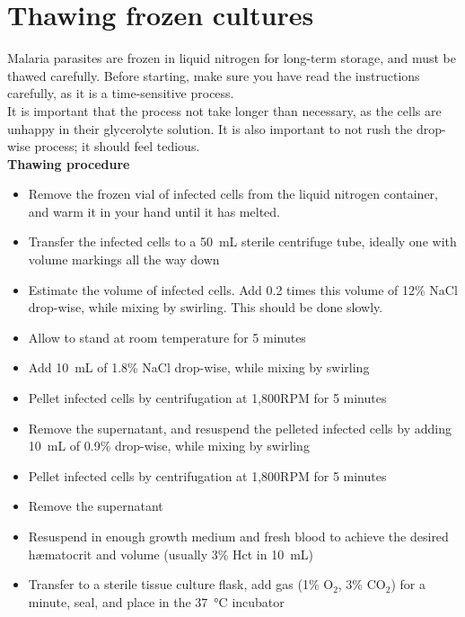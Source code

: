 \documentclass{article}
\begin{document}
\section{Thawing frozen cultures}

Malaria parasites are frozen in liquid nitrogen for long-term storage, and must be thawed carefully. Before starting, make sure you have read the instructions carefully, as it is a time-sensitive process.\\

It is important that the process not take longer than necessary, as the cells are unhappy in their glycerolyte solution. It is also important to not rush the drop-wise process; it should feel tedious.\\

\textbf{Thawing procedure}\\

\begin{itemize}
	\item Remove the frozen vial of infected cells from the liquid nitrogen container, and warm it in your hand until it has melted.
	\item Transfer the infected cells to a \SI{50}{mL} sterile centrifuge tube, ideally one with volume markings all the way down
	\item Estimate the volume of infected cells. Add 0.2 times this volume of 12\% NaCl drop-wise, while mixing by swirling. This should be done slowly.
	\item Allow to stand at room temperature for 5 minutes
	\item Add \SI{10}{mL} of 1.8\% NaCl drop-wise, while mixing by swirling
	\item Pellet infected cells by centrifugation at 1,800RPM for 5 minutes
	\item Remove the supernatant, and resuspend the pelleted infected cells by adding \SI{10}{mL} of 0.9\% drop-wise, while mixing by swirling
	\item Pellet infected cells by centrifugation at 1,800RPM for 5 minutes
	\item Remove the supernatant
	\item Resuspend in enough growth medium and fresh blood to achieve the desired h{\ae}matocrit and volume (usually 3\% Hct in \SI{10}{mL})
	\item Transfer to a sterile tissue culture flask, add gas (1\% O$_2$, 3\% CO$_2$) for a minute, seal, and place in the \SI{37}{\celsius} incubator
\end{itemize}
\end{document}

